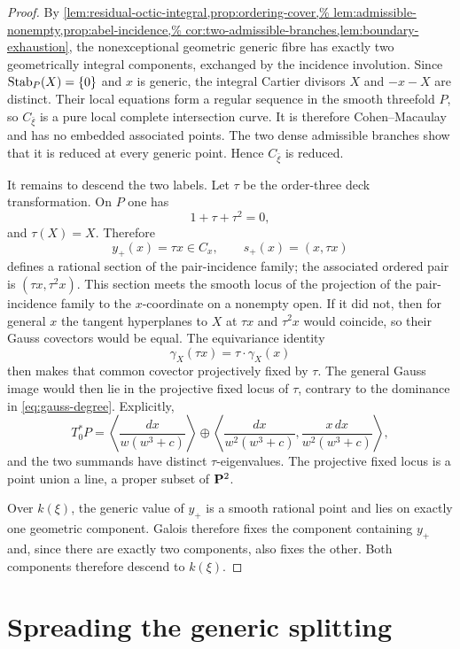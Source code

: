 \begin{proof}
By
\cref{lem:residual-octic-integral,prop:ordering-cover,%
lem:admissible-nonempty,prop:abel-incidence,%
cor:two-admissible-branches,lem:boundary-exhaustion},
the nonexceptional geometric generic fibre has exactly two geometrically
integral components, exchanged by the incidence involution.  Since
$\operatorname{Stab}_P(X)=\{0\}$ and $x$ is generic, the integral Cartier divisors $X$ and
$-x-X$ are distinct.  Their local equations form a regular sequence in the
smooth threefold $P$, so $C_{\bar\xi}$ is a pure local complete intersection
curve.  It is therefore Cohen--Macaulay and has no embedded associated
points.  The two dense admissible branches show that it is reduced at every
generic point.  Hence $C_{\bar\xi}$ is reduced.

It remains to descend the two labels.  Let $\tau$
be the order-three deck transformation.  On $P$ one has
\[
 1+\tau+\tau^2=0,
\]
and $\tau(X)=X$.  Therefore
\[
 y_+(x)=\tau x\in C_x,
 \qquad s_+(x)=(x,\tau x)
\]
defines a rational section of the pair-incidence family; the associated
ordered pair is $(\tau x,\tau^2x)$.  This section meets the smooth locus of the projection of the pair-incidence
family to the $x$-coordinate on a nonempty open.  If it did not, then for
general $x$ the tangent hyperplanes to $X$ at $\tau x$ and $\tau^2x$ would
coincide, so their Gauss covectors would be equal.  The equivariance identity
\[
 \gamma_X(\tau x)=\tau\cdot\gamma_X(x)
\]
then makes that common covector projectively fixed by $\tau$.  The general
Gauss image would then lie in the projective fixed locus of $\tau$, contrary
to the dominance in \eqref{eq:gauss-degree}.  Explicitly,
\[
 T_0^*P=
 \left\langle\frac{dx}{w(w^3+c)}\right\rangle
 \oplus
 \left\langle
   \frac{dx}{w^2(w^3+c)},
   \frac{x\,dx}{w^2(w^3+c)}
 \right\rangle,
\]
and the two summands have distinct $\tau$-eigenvalues.  The projective fixed
locus is a point union a line, a proper subset of $\mathbf P^2$.

Over $k(\xi)$, the generic value of $y_+$ is a smooth rational point and
lies on exactly one geometric component.  Galois therefore fixes the
component containing $y_+$ and, since there are exactly two components,
also fixes the other.  Both components therefore descend to $k(\xi)$.
\end{proof}

\section{Spreading the generic splitting}\label{sec:spreading}

